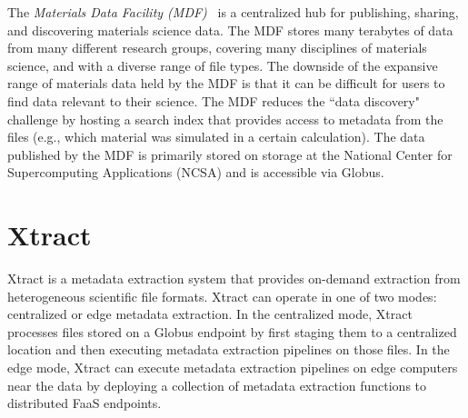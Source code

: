 \documentclass[sigconf]{acmart}
\newcommand{\name}{Xtract}
\begin{document}
The \emph{Materials Data Facility (MDF)}~\cite{blaiszik2016materials, blaiszik2019mdf}
is a centralized hub for publishing, sharing, and discovering materials science data. 
The MDF stores many terabytes of data from many different research groups, covering many disciplines of 
materials science, and with a diverse range of file types.
The downside of the expansive range of materials data held by the MDF 
is that it can be difficult for users to find data relevant to their science.
The MDF reduces the ``data discovery" challenge by hosting a search index that provides access to metadata from the 
files (e.g., which material was simulated in a certain calculation).
The data published by the MDF is primarily stored on storage at the National Center for Supercomputing Applications
(NCSA) and is accessible via Globus. 


\section{Xtract}
\label{sec:xtracthub}%

\name{} is a metadata extraction system that provides on-demand extraction
from  heterogeneous scientific file formats. 
\name{} can operate in one of two modes: centralized or edge metadata extraction. 
In the centralized mode, \name{} processes files stored on a Globus endpoint by first staging
them to a centralized location and then executing metadata extraction pipelines on those files. 
In the edge mode, \name{} can execute metadata extraction pipelines on edge computers near
the data by deploying a collection of metadata extraction functions to distributed FaaS endpoints. 
\end{document}
